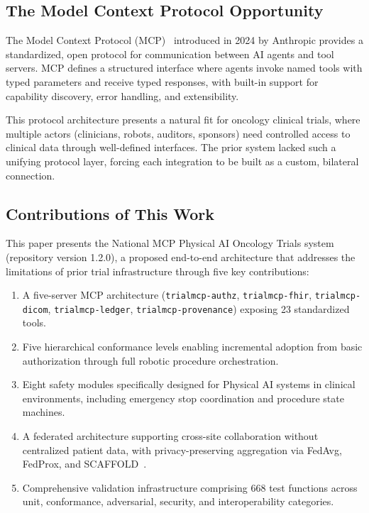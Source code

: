 \documentclass{article}
\begin{document}
\subsection{The Model Context Protocol Opportunity}

The Model Context Protocol (MCP)~\cite{mcp2024protocol} introduced in 2024 by Anthropic provides a standardized, open protocol for communication between AI agents and tool servers. MCP defines a structured interface where agents invoke named tools with typed parameters and receive typed responses, with built-in support for capability discovery, error handling, and extensibility.

This protocol architecture presents a natural fit for oncology clinical trials, where multiple actors (clinicians, robots, auditors, sponsors) need controlled access to clinical data through well-defined interfaces. The prior system lacked such a unifying protocol layer, forcing each integration to be built as a custom, bilateral connection.

\subsection{Contributions of This Work}

This paper presents the National MCP Physical AI Oncology Trials system (repository version 1.2.0), a proposed end-to-end architecture that addresses the limitations of prior trial infrastructure through five key contributions:

\begin{enumerate}[leftmargin=*]
\item A five-server MCP architecture (\texttt{trialmcp-authz}, \texttt{trialmcp-fhir}, \texttt{trialmcp-dicom}, \texttt{trialmcp-ledger}, \texttt{trialmcp-provenance}) exposing 23 standardized tools.
\item Five hierarchical conformance levels enabling incremental adoption from basic authorization through full robotic procedure orchestration.
\item Eight safety modules specifically designed for Physical AI systems in clinical environments, including emergency stop coordination and procedure state machines.
\item A federated architecture supporting cross-site collaboration without centralized patient data, with privacy-preserving aggregation via FedAvg, FedProx, and SCAFFOLD~\cite{mcmahan2017fedavg,kairouz2021federated}.
\item Comprehensive validation infrastructure comprising 668 test functions across unit, conformance, adversarial, security, and interoperability categories.
\end{enumerate}
\end{document}
